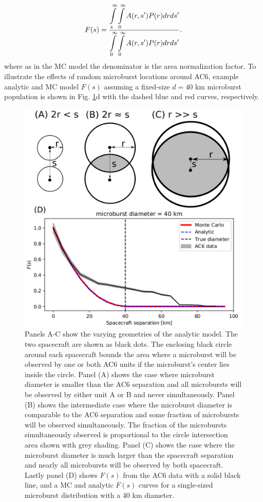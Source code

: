 \documentclass[draft]{agujournal2019}
\begin{document}
\begin{equation} \label{analytic_integral}
F(s) = \frac{\displaystyle\int\displaylimits_{s}^{\infty} \displaystyle\int\displaylimits_0^{\infty} A(r, s') P(r) dr ds'}{\displaystyle\int\displaylimits_{0}^{\infty} \displaystyle\int\displaylimits_0^{\infty} A(r, s') P(r) dr ds'} .
\end{equation} where as in the MC model the denominator is the area normalization factor. To illustrate the effects of random microburst locations around AC6, example analytic and MC model $F(s)$ assuming a fixed-size $d = 40$ km microburst population is shown in Fig. \ref{fig5}d with the dashed blue and red curves, respectively.

\begin{figure}
\includegraphics[width=\textwidth]{fig5.png}
\caption{Panels A-C show the varying geometries of the analytic model. The two spacecraft are shown as black dots. The enclosing black circle around each spacecraft bounds the area where a microburst will be observed by one or both AC6 units if the microburst's center lies inside the circle. Panel (A) shows the case where microburst diameter is smaller than the AC6 separation and all microbursts will be observed by either unit A or B and never simultaneously. Panel (B) shows the intermediate case where the microburst diameter is comparable to the AC6 separation and some fraction of microbursts will be observed simultaneously. The fraction of the microbursts simultaneously observed is proportional to the circle intersection area shown with grey shading. Panel (C) shows the case where the microburst diameter is much larger than the spacecraft separation and nearly all microbursts will be observed by both spacecraft. Lastly panel (D) shows $F(s)$ from the AC6 data with a solid black line, and a MC and analytic $F(s)$ curves for a single-sized microburst distribution with a 40 km diameter.} 
\label{fig5}
\end{figure}
\end{document}
